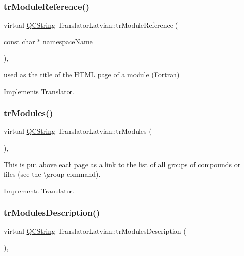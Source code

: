 \subsubsection{\texorpdfstring{trModuleReference()}{trModuleReference()}}
{\footnotesize\ttfamily virtual \mbox{\hyperlink{class_q_c_string}{Q\+C\+String}} Translator\+Latvian\+::tr\+Module\+Reference (\begin{DoxyParamCaption}\item[{const char $\ast$}]{namespace\+Name }\end{DoxyParamCaption})\hspace{0.3cm}{\ttfamily [inline]}, {\ttfamily [virtual]}}

used as the title of the H\+T\+ML page of a module (Fortran) 

Implements \mbox{\hyperlink{class_translator}{Translator}}.

\mbox{\label{class_translator_latvian_a0f720afc4aabc7b14b5dcbb0fa660b1a}} 
\subsubsection{\texorpdfstring{trModules()}{trModules()}}
{\footnotesize\ttfamily virtual \mbox{\hyperlink{class_q_c_string}{Q\+C\+String}} Translator\+Latvian\+::tr\+Modules (\begin{DoxyParamCaption}{ }\end{DoxyParamCaption})\hspace{0.3cm}{\ttfamily [inline]}, {\ttfamily [virtual]}}

This is put above each page as a link to the list of all groups of compounds or files (see the \textbackslash{}group command). 

Implements \mbox{\hyperlink{class_translator}{Translator}}.

\mbox{\label{class_translator_latvian_a86678221c9cc9adc2c20a304adea5c5d}} 
\subsubsection{\texorpdfstring{trModulesDescription()}{trModulesDescription()}}
{\footnotesize\ttfamily virtual \mbox{\hyperlink{class_q_c_string}{Q\+C\+String}} Translator\+Latvian\+::tr\+Modules\+Description (\begin{DoxyParamCaption}{ }\end{DoxyParamCaption})\hspace{0.3cm}{\ttfamily [inline]}, {\ttfamily [virtual]}}


